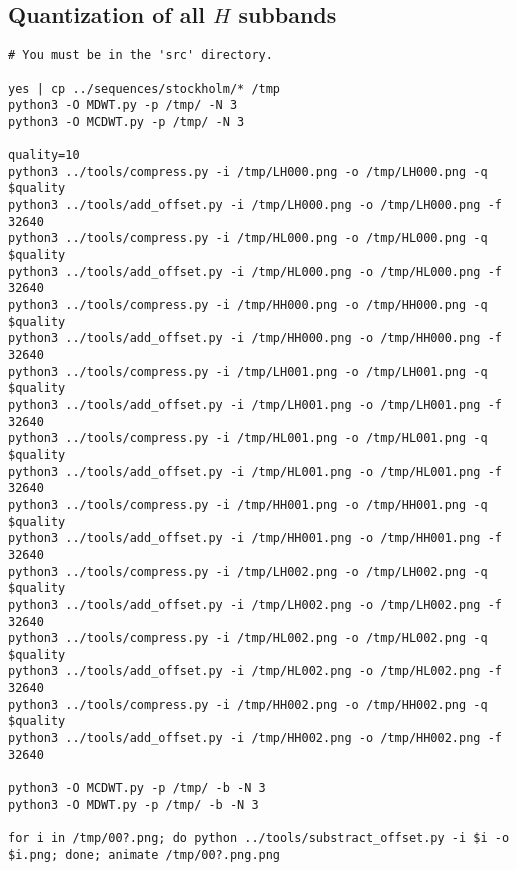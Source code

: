 \subsection*{Quantization of all $H$ subbands}
\begin{verbatim}
# You must be in the 'src' directory.

yes | cp ../sequences/stockholm/* /tmp
python3 -O MDWT.py -p /tmp/ -N 3
python3 -O MCDWT.py -p /tmp/ -N 3

quality=10
python3 ../tools/compress.py -i /tmp/LH000.png -o /tmp/LH000.png -q $quality
python3 ../tools/add_offset.py -i /tmp/LH000.png -o /tmp/LH000.png -f 32640
python3 ../tools/compress.py -i /tmp/HL000.png -o /tmp/HL000.png -q $quality
python3 ../tools/add_offset.py -i /tmp/HL000.png -o /tmp/HL000.png -f 32640
python3 ../tools/compress.py -i /tmp/HH000.png -o /tmp/HH000.png -q $quality
python3 ../tools/add_offset.py -i /tmp/HH000.png -o /tmp/HH000.png -f 32640
python3 ../tools/compress.py -i /tmp/LH001.png -o /tmp/LH001.png -q $quality
python3 ../tools/add_offset.py -i /tmp/LH001.png -o /tmp/LH001.png -f 32640
python3 ../tools/compress.py -i /tmp/HL001.png -o /tmp/HL001.png -q $quality
python3 ../tools/add_offset.py -i /tmp/HL001.png -o /tmp/HL001.png -f 32640
python3 ../tools/compress.py -i /tmp/HH001.png -o /tmp/HH001.png -q $quality
python3 ../tools/add_offset.py -i /tmp/HH001.png -o /tmp/HH001.png -f 32640
python3 ../tools/compress.py -i /tmp/LH002.png -o /tmp/LH002.png -q $quality
python3 ../tools/add_offset.py -i /tmp/LH002.png -o /tmp/LH002.png -f 32640
python3 ../tools/compress.py -i /tmp/HL002.png -o /tmp/HL002.png -q $quality
python3 ../tools/add_offset.py -i /tmp/HL002.png -o /tmp/HL002.png -f 32640
python3 ../tools/compress.py -i /tmp/HH002.png -o /tmp/HH002.png -q $quality
python3 ../tools/add_offset.py -i /tmp/HH002.png -o /tmp/HH002.png -f 32640

python3 -O MCDWT.py -p /tmp/ -b -N 3
python3 -O MDWT.py -p /tmp/ -b -N 3

for i in /tmp/00?.png; do python ../tools/substract_offset.py -i $i -o $i.png; done; animate /tmp/00?.png.png
\end{verbatim}

